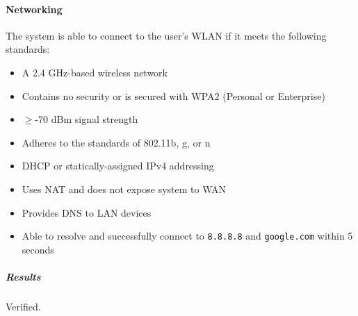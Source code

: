 \paragraph{Networking} The system is able to connect to the user's WLAN if it meets the following standards:
\begin{itemize}
    \item A 2.4 GHz-based wireless network
    \item Contains no security or is secured with WPA2 (Personal or Enterprise)
    \item $\geq$-70 dBm signal strength
    \item Adheres to the standards of 802.11b, g, or n
    \item DHCP or statically-assigned IPv4 addressing
    \item Uses NAT and does not expose system to WAN
    \item Provides DNS to LAN devices
    \item Able to resolve and successfully connect to \texttt{8.8.8.8} and \texttt{google.com} within 5 seconds
\end{itemize}
\subparagraph{Results} Verified.